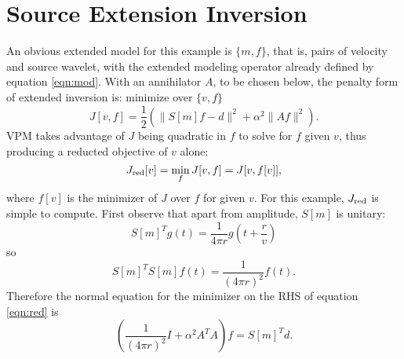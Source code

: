 \section{Source Extension Inversion}
An obvious extended model for this example is $\{m,f\}$, that is, pairs of velocity and source wavelet, with the extended modeling operator already defined by equation \ref{eqn:mod}. With an annihilator $A$, to be chosen below, the penalty form of extended inversion is: minimize over $\{v,f\}$
\begin{equation}
\label{eqn:obj}
J[v,f] = \frac{1}{2}(\|S[m]f-d\|^2 + \alpha^2 \|Af\|^2).
\end{equation}
VPM \cite[]{GolubPereyra:03} takes advantage of $J$ being quadratic in $f$ to solve for $f$ given $v$, thus producing a reducted objective of $v$ alone:
\begin{equation}
\label{eqn:red}
J_{\rm red}[v] = \min_f J[v,f] = J[v,f[v]],
\end{equation}
where $f[v]$ is the minimizer of $J$ over $f$ for given $v$.
For this example, $J_{\rm red}$ is simple to compute. First observe that apart from amplitude, $S[m]$ is unitary:
\begin{equation}
\label{eqn:tran}
S[m]^T g (t) = \frac{1}{4\pi r}g\left(t+\frac{r}{v}\right)
\end{equation}
so
\begin{equation}
\label{eqn:unit}
S[m]^TS[m] f (t) = \frac{1}{(4\pi r)^2} f(t).
\end{equation}
Therefore the normal equation for the minimizer on the RHS of equation \ref{eqn:red} is
\begin{equation}
\label{eqn:norm1}
\left(\frac{1}{(4\pi r)^2} I + \alpha^2 A^TA\right)f = S[m]^Td.
\end{equation}


